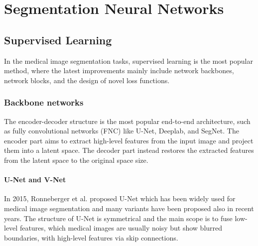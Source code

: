 
\chapter{Segmentation Neural Networks}

\label{chp:segmentation}

\def\:{\hskip0pt} %


\section{Supervised Learning}
In the medical image segmentation tasks, supervised learning is the most popular method, where the latest improvements mainly include network backbones, network blocks, and the design of novel loss functions.

\subsection{Backbone networks}
The encoder-decoder structure is the most popular end-to-end architecture, such as fully convolutional networks (FNC) like U-Net, Deeplab, and SegNet. The encoder part aims to extract high-level features from the input image and project them into a latent space. The decoder part instead restores the extracted features
from the latent space to the original space size.

\subsubsection{U-Net and V-Net}
In 2015, Ronneberger et al.
proposed U-Net which has been widely used for medical image segmentation and
many variants have been proposed also in recent years. The structure of U-Net
is symmetrical and the main scope is to fuse low-level features, which medical
images are usually noisy but show blurred boundaries, with high-level features
via skip connections.

